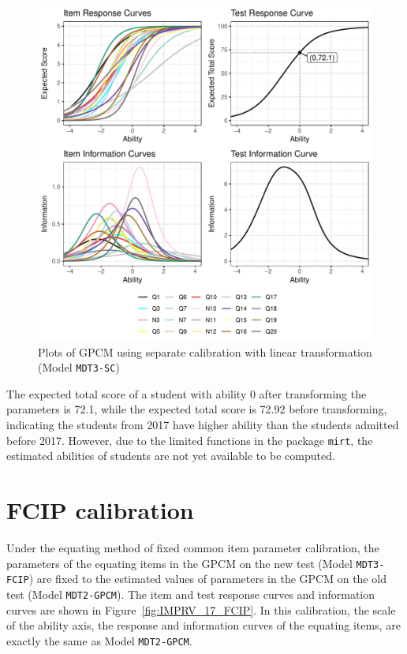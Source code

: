\documentclass[a4paper]{report}
\begin{document}
\begin{figure}[H]
  \centering
  \includegraphics[width=\linewidth]{fig/IMPRV_17_SC.pdf}
  \caption{\label{fig:IMPRV_17_SC}Plots of GPCM using separate calibration with linear transformation (Model \texttt{MDT3-SC})}
\end{figure}

The expected total score of a student with ability 0 after transforming the parameters is 72.1, while the expected total score is 72.92 before transforming, indicating the students from 2017 have higher ability than the students admitted before 2017. However, due to the limited functions in the package \texttt{mirt}, the estimated abilities of students are not yet available to be computed. 

\section{FCIP calibration}

Under the equating method of fixed common item parameter calibration, the parameters of the equating items in the GPCM on the new test (Model \texttt{MDT3-FCIP}) are fixed to the estimated values of parameters in the GPCM on the old test (Model \texttt{MDT2-GPCM}). The item and test response curves and information curves are shown in Figure~\ref{fig:IMPRV_17_FCIP}. In this calibration, the scale of the ability axis, the response and information curves of the equating items, are exactly the same as Model \texttt{MDT2-GPCM}. 
\end{document}
